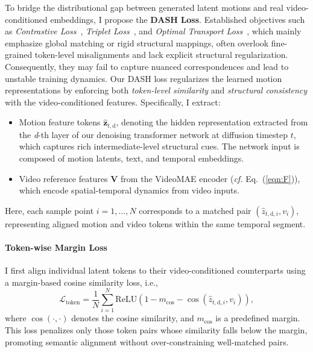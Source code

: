 \documentclass[a4paper,12pt]{article}
\begin{document}
To bridge the distributional gap between generated latent motions and real video-conditioned embeddings, I propose the \textbf{DASH} \textbf{Loss}. Established objectives such as \textit{Contrastive Loss}~\cite{radford2021learning}, \textit{Triplet Loss}~\cite{schroff2015facenet}, and \textit{Optimal Transport Loss}~\cite{peyre2019computational}, which mainly emphasize global matching or rigid structural mappings, often overlook fine-grained token-level misalignments and lack explicit structural regularization. Consequently, they may fail to capture nuanced correspondences and lead to unstable training dynamics. Our DASH loss regularizes the learned motion representations by enforcing both \emph{token-level similarity} and \emph{structural consistency} with the video-conditioned features.
%
Specifically, I extract:
\begin{itemize}
    \item Motion feature tokens \(\hat{\mathbf{z}}_{t,\text{d}}\), denoting the hidden representation extracted from the \textit{d}-th layer of our denoising transformer network at diffusion timestep \(t\), which captures rich intermediate-level structural cues. The network input is composed of motion latents, text, and temporal embeddings.
    \item Video reference features \(\mathbf{V}\) from the VideoMAE encoder (\textit{cf.} Eq.~(\ref{eqn:F})), which encode spatial-temporal dynamics from video inputs.
\end{itemize}

Here, each sample point \(i = 1, \dots, N\) corresponds to a matched pair \((\hat{z}_{t,\text{d},i}, v_i)\), representing aligned motion and video tokens within the same temporal segment.

\paragraph{Token-wise Margin Loss}
I first align individual latent tokens to their video-conditioned counterparts using a margin-based cosine similarity loss, i.e.,
\begin{equation}
\mathcal{L}_{\text{token}} = \frac{1}{N} \sum_{i=1}^{N} \text{ReLU} \left( 1 - m_{\text{cos}} - \cos(\hat{z}_{t,\text{d},i}, v_i) \right),
\end{equation}
where $\cos(\cdot,\cdot)$ denotes the cosine similarity, and $m_{\text{cos}}$ is a predefined margin. This loss penalizes only those token pairs whose similarity falls below the margin, promoting semantic alignment without over-constraining well-matched pairs.
\end{document}
